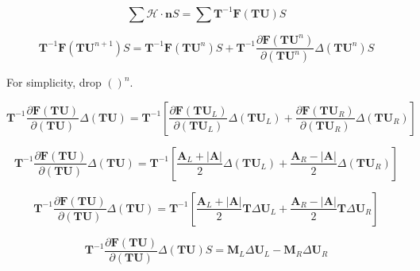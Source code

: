 \documentclass{article}
\begin{document}
\newcommand{\Mi}{\mathbf{M}_i}
\newcommand{\Mj}{\mathbf{M}_j}
\newcommand{\NL}{\mathbf{N}_L}
\newcommand{\NR}{\mathbf{N}_R}
\newcommand{\ML}{\mathbf{M}_L}
\newcommand{\MR}{\mathbf{M}_R}
\newcommand{\AL}{\mathbf{A}_L}
\newcommand{\AR}{\mathbf{A}_R}
\newcommand{\Aroe}{\lvert\mathbf{A}\rvert}
\newcommand{\rotmat}{\mathbf{T}}
\newcommand{\flux}{\mathbf{F}}
\newcommand{\cons}{\mathbf{U}}
\newcommand{\invrotmat}{\mathbf{T}^{-1}}
\newcommand{\R}{\mathbf{R}}
\newcommand{\T}{\mathbf{T}}

\begin{equation}
    \sum\mathcal{H} \cdot \mathbf{n}S
    =
    \sum\invrotmat\flux(\rotmat\cons)S
\end{equation}

\begin{equation}
    \invrotmat\flux(\rotmat\cons^{n+1})S
    =
    \invrotmat\flux(\rotmat\cons^{n})S
    +
    \invrotmat\frac{\partial\flux(\rotmat\cons^n)}{\partial(\rotmat\cons^n)}\Delta(\rotmat\cons^n)S
\end{equation}

For simplicity, drop $()^n$. 

\begin{equation}
    \invrotmat\frac{\partial\flux(\rotmat\cons)}{\partial(\rotmat\cons)}\Delta(\rotmat\cons)
    =
    \invrotmat
    \left[
        \frac{\partial\flux(\rotmat\cons_L)}{\partial(\rotmat\cons_L)}\Delta(\rotmat\cons_L)
        +
        \frac{\partial\flux(\rotmat\cons_R)}{\partial(\rotmat\cons_R)}\Delta(\rotmat\cons_R)
    \right]
\end{equation}

\begin{equation}
    \invrotmat\frac{\partial\flux(\rotmat\cons)}{\partial(\rotmat\cons)}\Delta(\rotmat\cons)
    =
    \invrotmat
    \left[
        \frac{\AL + \Aroe}{2}\Delta(\rotmat\cons_L)
        +
        \frac{\AR - \Aroe}{2}\Delta(\rotmat\cons_R)
    \right]
\end{equation}

\begin{equation}
    \invrotmat\frac{\partial\flux(\rotmat\cons)}{\partial(\rotmat\cons)}\Delta(\rotmat\cons)
    =
    \invrotmat
    \left[
        \frac{\AL + \Aroe}{2}\rotmat\Delta\cons_L
        +
        \frac{\AR - \Aroe}{2}\rotmat\Delta\cons_R
    \right]
\end{equation}

\begin{equation}
    \invrotmat\frac{\partial\flux(\rotmat\cons)}{\partial(\rotmat\cons)}\Delta(\rotmat\cons)S
    =
    \ML\Delta\cons_L
    -
    \MR\Delta\cons_R
\end{equation}
\end{document}
